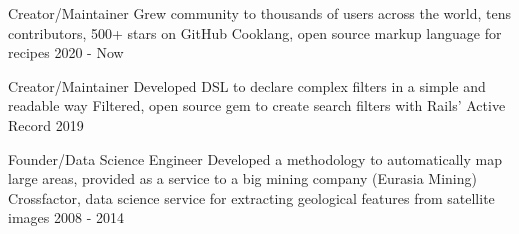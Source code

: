 
\begin{cventries}

  \cvblitz
    {Creator/Maintainer}
    {Grew community to thousands of users across the world, tens contributors, 500+ stars on GitHub} %
    {Cooklang, open source markup language for recipes} %
    {} %
    {2020 - Now} %

  \cvblitz
    {Creator/Maintainer}
    {Developed DSL to declare complex filters in a simple and readable way} %
    {Filtered, open source gem to create search filters with Rails’ Active Record} %
    {} %
    {2019} %

  \cvblitz
    {Founder/Data Science Engineer}
    {Developed a methodology to automatically map large areas, provided as a service to a big mining company (Eurasia Mining)} %
    {Crossfactor, data science service for extracting geological features from satellite images} %
    {} %
    {2008 - 2014} %


\end{cventries}
